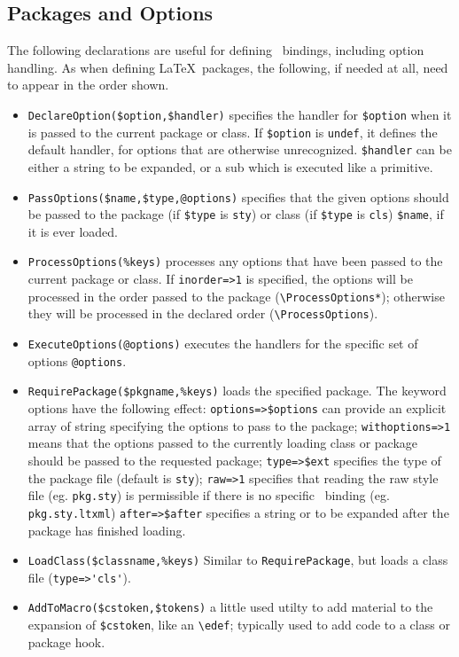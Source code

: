 \documentclass{book}
\newcommand{\ltxcode}{\lstinline[style=inlinelatexml]}
\begin{document}
\subsection{Packages and Options}\label{customization.latexml.packages}
The following declarations are useful for defining \LaTeXML\ bindings,
including option handling.
As when defining \LaTeX\ packages, the following, if needed at all,
need to appear in the order shown.
\begin{itemize}
\item \ltxcode|DeclareOption($option,$handler)| specifies the handler
for \ltxcode|$option| when it is passed to the current package or class.
If \ltxcode|$option| is \texttt{undef}, it defines the default handler,
for options that are otherwise unrecognized.
\ltxcode|$handler| can be either a string to be expanded, or a sub which
is executed like a primitive.
\item \ltxcode|PassOptions($name,$type,@options)|  specifies that the
given options should be passed to the package (if \ltxcode|$type| is \texttt{sty})
or class (if \ltxcode|$type| is \texttt{cls}) \ltxcode|$name|, if it is ever loaded.
\item \ltxcode|ProcessOptions(%
been passed to the current package or class.  If \ltxcode|inorder=>1| is
specified, the options will be processed in the order passed to the
package (\verb|\ProcessOptions*|); otherwise they will be processed
in the declared order (\verb|\ProcessOptions|).
\item \ltxcode|ExecuteOptions(@options)|
executes the handlers for the specific set of options \ltxcode|@options|.
\item \ltxcode|RequirePackage($pkgname,%
The keyword options have the following effect: \ltxcode|options=>$options|
can provide an explicit array of string specifying the options to pass to the package;
\ltxcode|withoptions=>1| means that the options passed to the currently loading
class or package should be passed to the requested package;
\ltxcode|type=>$ext| specifies the type of the package file (default is \texttt{sty});
\ltxcode|raw=>1| specifies that reading the raw style file (eg. \texttt{pkg.sty})
is permissible if there is no specific \LaTeXML\ binding (eg. \texttt{pkg.sty.ltxml})
\ltxcode|after=>$after| specifies a string or  to be expanded
after the package has finished loading.
\item \ltxcode|LoadClass($classname,%
Similar to \texttt{RequirePackage}, but loads a class file (\ltxcode|type=>'cls'|).
\item \ltxcode|AddToMacro($cstoken,$tokens)| a little used utilty to add
material to the expansion of \ltxcode|$cstoken|, like an \verb|\edef|;
typically used to add code to a class or package hook.
\end{itemize}
\end{document}
